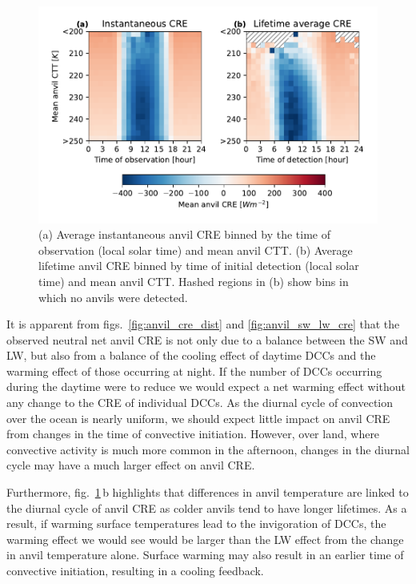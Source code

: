 \documentclass[acp, manuscript]{copernicus}
\begin{document}
\begin{figure}[tp]
    \includegraphics[width=12cm]{figures/fig13.pdf}
    \caption[
    Average anvil CRE binned by the time of detection (local time) and mean anvil CTT
    ]{
    (a) Average instantaneous anvil CRE binned by the time of observation (local solar time) and mean anvil CTT. (b) Average lifetime anvil CRE binned by time of initial detection (local solar time) and mean anvil CTT. Hashed regions in (b) show bins in which no anvils were detected.
    }
    \label{fig:anvil_cre_time_vs_ctt}
\end{figure}


It is apparent from figs.~\ref{fig:anvil_cre_dist} and \ref{fig:anvil_sw_lw_cre} that the observed neutral net anvil CRE is not only due to a balance between the SW and LW, but also from a balance of the cooling effect of daytime DCCs and the warming effect of those occurring at night. 
If the number of DCCs occurring during the daytime were to reduce we would expect a net warming effect without any change to the CRE of individual DCCs.
As the diurnal cycle of convection over the ocean is nearly uniform, we should expect little impact on anvil CRE from changes in the time of convective initiation.
However, over land, where convective activity is much more common in the afternoon, changes in the diurnal cycle may have a much larger effect on anvil CRE.

Furthermore, fig.~\ref{fig:anvil_cre_time_vs_ctt}\,b highlights that differences in anvil temperature are linked to the diurnal cycle of anvil CRE as colder anvils tend to have longer lifetimes.
As a result, if warming surface temperatures lead to the invigoration of DCCs, the warming effect we would see would be larger than the LW effect from the change in anvil temperature alone. 
Surface warming may also result in an earlier time of convective initiation, resulting in a cooling feedback.
\end{document}

